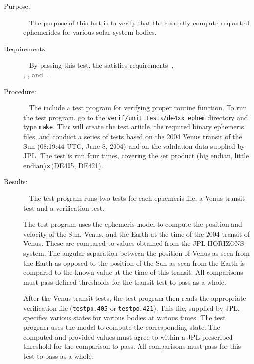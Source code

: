 \label{test:de4xx_unit_test}
\begin{description}
\item[Purpose:] \ \newline
The purpose of this test is to verify that the \ModelDesc
correctly compute requested ephemerides for various solar system bodies.
\item[Requirements:] \ \newline
By passing this test, the \ModelDesc satisfies
requirements~,\\
, 
,
and~.
\item[Procedure:]\ \newline
The \ModelDesc include a test program for verifying proper routine 
function. To run the test program, go to the
\verb+verif/unit_tests/de4xx_ephem+ directory and type {\tt make}.
This will create the test article, the required binary ephemeris files,
and conduct a series of tests based on the
2004 Venus transit of the Sun (08:19:44 UTC, June 8, 2004)
and on the validation data supplied by JPL.
The test is run four times, covering the set product
(big endian, little endian)$\times$(DE405, DE421).
\item[Results:]\ \newline
The test program runs two tests for each ephemeris file, a Venus transit test
and a verification test.

The test program uses the ephemeris model to compute the position and velocity
of the Sun, Venus, and the Earth at the time of the 2004 transit of Venus.
These are compared to values obtained from the JPL HORIZONS system.
The angular separation between the position of Venus as seen from the Earth as
opposed to the position of the Sun as seen from the Earth is compared to the
known value at the time of this transit. All comparisons must pass defined
thresholds for the transit test to pass as a whole.

After the Venus transit tests, the test program then reads the appropriate
verification file ({\tt testpo.405} or {\tt testpo.421}). This file,
supplied by JPL, specifies various states for various bodies at various times.
The test program uses the model to compute the corresponding state. The
computed and provided values must agree to within a JPL-prescribed threshold
for the comparison to pass.
All comparisons must pass for this test to pass as a whole.


\end{description}
